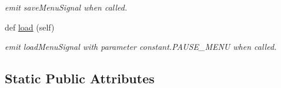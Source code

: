 \begin{DoxyCompactItemize}
\begin{DoxyCompactList}\small\item\em emit save\+Menu\+Signal when called. \end{DoxyCompactList}\item 
def \hyperlink{classsrc_1_1pause__menu_1_1_pause_menu_aa3714c919e9514631cd66c6714c1e243}{load} (self)
\begin{DoxyCompactList}\small\item\em emit load\+Menu\+Signal with parameter \textquotesingle{}constant.\+P\+A\+U\+S\+E\+\_\+\+M\+E\+N\+U\textquotesingle{} when called. \end{DoxyCompactList}\end{DoxyCompactItemize}
\subsection*{Static Public Attributes}
